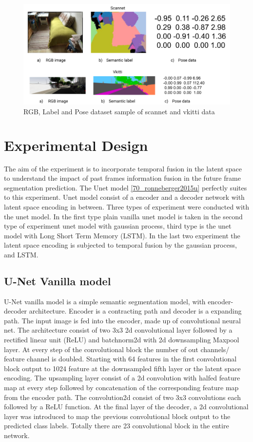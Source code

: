 	\begin{figure}[h]
		\centering
		\includegraphics[width=14cm]{images/scannet_vkitti_data.png}
		\caption{RGB, Label and Pose dataset sample of scannet and vkitti data}
		\label{fig:scannet_vkitti}
	\end{figure}	
	
	
    \section{Experimental Design}
    
    The aim of the experiment is to incorporate temporal fusion in the latent space to understand the impact of past frames information fusion in the future frame segmentation prediction. The Unet model \ref{70_ronneberger2015u} perfectly suites to this experiment. Unet model consist of a encoder and a decoder network with latent space encoding in between. Three types of experiment were conducted with the unet model. In the first type plain vanilla unet model is taken in the second type of experiment unet model with gaussian process, third type is the unet model with Long Short Term Memory (LSTM). In the last two experiment the latent space encoding is subjected to temporal fusion by the gaussian process, and LSTM.   
    
    \subsection{U-Net Vanilla model}
    
    U-Net vanilla model is a simple semantic segmentation model, with encoder-decoder architecture. Encoder is a contracting path and decoder is a expanding path. The input image is fed into the encoder, made up of convolutional neural net. The architecture consist of two 3x3 2d convolutional layer followed by a rectified linear unit (ReLU) and batchnorm2d with 2d downsampling Maxpool layer. At every step of the convolutional block the number of out channels/ feature channel is doubled. Starting with 64 features in the first convolutional block output to 1024 feature at the downsampled fifth layer or the latent space encoding. The upsampling layer consist of a 2d convolution with halfed feature map at every step followed by concatenation of the corresponding feature map from the encoder path. The convolution2d consist of two 3x3 convolutions each followed by a ReLU function. At the final layer of the decoder, a 2d convolutional layer was introduced to map the previous convolutional block output to the predicted class labels. Totally there are 23 convolutional block in the entire network.    
	
